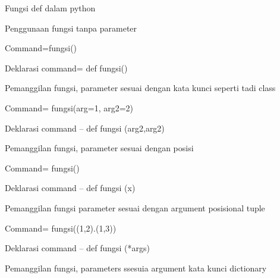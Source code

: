 \vspace{14pt}
\noindent 
{\fontsize{14pt}{14pt}\selectfont Fungsi def dalam python \\} \par
\noindent 
{\fontsize{14pt}{14pt}\selectfont Penggunaan fungsi tanpa parameter \\} \par
\noindent 
{\fontsize{14pt}{14pt}\selectfont Command=fungsi() \\} \par
\noindent 
{\fontsize{14pt}{14pt}\selectfont Deklarasi command= def fungsi() \\} \par
\vspace{14pt}
\noindent 
{\fontsize{14pt}{14pt}\selectfont Pemanggilan fungsi, parameter sesuai dengan kata kunci seperti tadi class \\} \par
\noindent 
{\fontsize{14pt}{14pt}\selectfont Command= fungsi(arg=1, arg2=2) \\} \par
\noindent 
{\fontsize{14pt}{14pt}\selectfont Deklarasi command – def fungsi (arg2,arg2) \\} \par
\vspace{14pt}
\noindent 
{\fontsize{14pt}{14pt}\selectfont Pemanggilan fungsi, parameter sesuai dengan posisi \\} \par
\noindent 
{\fontsize{14pt}{14pt}\selectfont Command= fungsi() \\} \par
\noindent 
{\fontsize{14pt}{14pt}\selectfont Deklarasi command – def fungsi (x) \\} \par
\vspace{14pt}
\noindent 
{\fontsize{14pt}{14pt}\selectfont Pemanggilan fungsi parameter sesuai dengan argument posisional tuple \\} \par
\noindent 
{\fontsize{14pt}{14pt}\selectfont Command= fungsi((1,2).(1,3)) \\} \par
\noindent 
{\fontsize{14pt}{14pt}\selectfont Deklarasi command – def fungsi (*args) \\} \par
\vspace{14pt}
\noindent 
{\fontsize{14pt}{14pt}\selectfont Pemanggilan fungsi, parameters ssesuia argument kata kunci dictionary \\} \par
